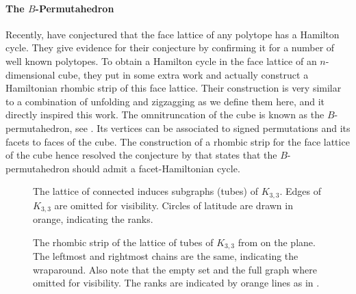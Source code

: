 \documentclass[fontsize=11pt,a4paper,DIV=12]{scrartcl}
\begin{document}
\paragraph{The $B$-Permutahedron}
Recently, \textcite{Listing_faces} have conjectured that the face lattice of any polytope has a Hamilton cycle. They give evidence for their conjecture by confirming it for a number of well known polytopes. To obtain a Hamilton cycle in the face lattice of an $n$-dimensional cube, they put in some extra work and actually construct a Hamiltonian rhombic strip of this face lattice. Their construction is very similar to a combination of unfolding and zigzagging as we define them here, and it directly inspired this work. The omnitruncation of the cube is known as the $B$-permutahedron, see . Its vertices can be associated to signed permutations and its facets to faces of the cube. The construction of a rhombic strip for the face lattice of the cube hence resolved the conjecture by \textcite{facethamiltonicity} that states that the $B$-permutahedron should admit a facet-Hamiltonian cycle.

\begin{figure}
    \centering
    
    \caption{The lattice of connected induces subgraphs (tubes) of $K_{3,3}$. Edges of $K_{3,3}$ are omitted for visibility. Circles of latitude are drawn in orange, indicating the ranks.}
    \label{fig:K33 on sphere}
\end{figure}

\begin{figure}
    \centering
    \makebox[\textwidth][c]{}
    \caption{The rhombic strip of the lattice of tubes of $K_{3,3}$ from  on the plane. The leftmost and rightmost chains are the same, indicating the wraparound. Also note that the empty set and the full graph where omitted for visibility. The ranks are indicated by orange lines as in .}
    \label{fig:K33 on plane}
\end{figure}
\end{document}
